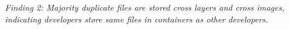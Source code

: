 \textit{Finding 2: Majority duplicate files are stored cross layers and cross
images, indicating developers store same files in containers as other
developers.} 
%






